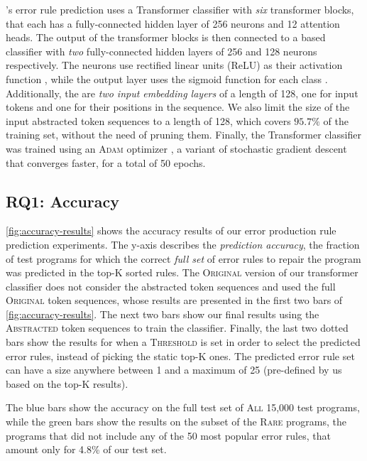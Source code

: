 \toolname's error rule prediction uses a Transformer classifier with \emph{six}
transformer blocks, that each has a fully-connected hidden layer of 256 neurons
and 12 attention heads. The output of the transformer blocks is then connected
to a \dnn based classifier with \emph{two} fully-connected hidden layers of 256
and 128 neurons respectively. The neurons use rectified linear units (ReLU) as
their activation function \citep{Nair2010-xg}, while the output layer uses the
sigmoid function for each class \citep{Nielsen2015-pu}. Additionally, the are
\emph{two input embedding layers} of a length of 128, one for input tokens and
one for their positions in the sequence. We also limit the size of the input
abstracted token sequences to a length of 128, which covers $95.7\%$ of the
training set, without the need of pruning them. Finally, the Transformer
classifier was trained using an \textsc{Adam} optimizer \citep{Kingma2014-ng}, a
variant of stochastic gradient descent that converges faster, for a total of 50
epochs.

\subsection{RQ1: Accuracy}
\label{sec:eval:accuracy}



%
\autoref{fig:accuracy-results} shows the accuracy results of our error
production rule prediction experiments. The y-axis describes the
\emph{prediction accuracy}, \ie the fraction of test programs for which the
correct \emph{full set} of error rules to repair the program was predicted in
the top-K sorted rules.
%
The \textsc{Original} version of our transformer classifier does not consider
the abstracted token sequences and used the full \textsc{Original} token
sequences, whose results are presented in the first two bars of
\autoref{fig:accuracy-results}. The next two bars show our final results using
the \textsc{Abstracted} token sequences to train the classifier. Finally, the
last two dotted bars show the results for when a \textsc{Threshold} is set in
order to select the predicted error rules, instead of picking the static top-K
ones. The predicted error rule set can have a size anywhere between 1 and a
maximum of 25 (pre-defined by us based on the top-K results).

The blue bars show the accuracy on the full test set of \textsc{All} 15,000 test
programs, while the green bars show the results on the subset of the
\textsc{Rare} programs, \ie the programs that did not include any of the 50 most
popular error rules, that amount only for 4.8\% of our test set.

